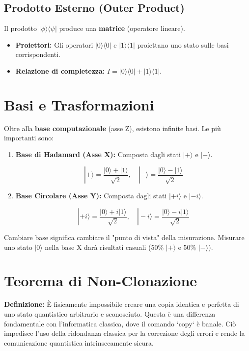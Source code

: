 \documentclass[12pt, a4paper]{article}
\begin{document}
\subsection{Prodotto Esterno (Outer Product)}
Il prodotto $|\phi\rangle\langle\psi|$ produce una \textbf{matrice} (operatore lineare).
\begin{itemize}
    \item \textbf{Proiettori:} Gli operatori $|0\rangle\langle 0|$ e $|1\rangle\langle 1|$ proiettano uno stato sulle basi corrispondenti.
    \item \textbf{Relazione di completezza:} $I = |0\rangle\langle 0| + |1\rangle\langle 1|$.
\end{itemize}

\section{Basi e Trasformazioni}
Oltre alla \textbf{base computazionale} (asse Z), esistono infinite basi. Le più importanti sono:
\begin{enumerate}
    \item \textbf{Base di Hadamard (Asse X):} Composta dagli stati $|+\rangle$ e $|-\rangle$.
    \begin{tcolorbox}
    \[
    |+\rangle = \frac{|0\rangle + |1\rangle}{\sqrt{2}}, \quad |-\rangle = \frac{|0\rangle - |1\rangle}{\sqrt{2}}
    \]
    \end{tcolorbox}
    \item \textbf{Base Circolare (Asse Y):} Composta dagli stati $|+i\rangle$ e $|-i\rangle$.
    \begin{tcolorbox}
    \[
    |+i\rangle = \frac{|0\rangle + i|1\rangle}{\sqrt{2}}, \quad |-i\rangle = \frac{|0\rangle - i|1\rangle}{\sqrt{2}}
    \]
    \end{tcolorbox}
\end{enumerate}

Cambiare base significa cambiare il "punto di vista" della misurazione. Misurare uno stato $|0\rangle$ nella base X darà risultati casuali (50\% $|+\rangle$ e 50\% $|-\rangle$).

\section{Teorema di Non-Clonazione}
\textbf{Definizione:} È fisicamente impossibile creare una copia identica e perfetta di uno stato quantistico arbitrario e sconosciuto.
Questa è una differenza fondamentale con l'informatica classica, dove il comando `copy` è banale. Ciò impedisce l'uso della ridondanza classica per la correzione degli errori e rende la comunicazione quantistica intrinsecamente sicura.
\end{document}
